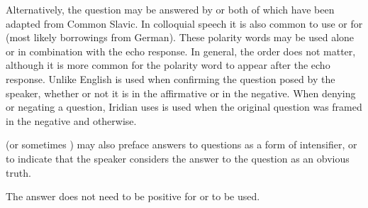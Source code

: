 \ex
{}
\xe

Alternatively, the question may be answered by  or 
both of which have been adapted from Common Slavic. In
colloquial speech it is also common to use  or  for 
(most likely borrowings from German). These polarity words may be
used alone or in combination with the echo response. In general, the order does
not matter, although it is more common for the polarity word to appear after the
echo response. Unlike English   is used when confirming the
question posed by the speaker, whether or not it is in the affirmative or in the
negative. When denying or negating a question, Iridian uses  is used
when the original question was framed in the negative and  otherwise.

\ex
{}\xe

\ex{}
\xe

 (or sometimes ) may also preface answers to questions as a
form of intensifier, or to indicate that the speaker considers the answer to the
question as an obvious truth.

\ex
{}\xe

The answer does not need to be positive for  or  to be used.

\ex{}
\xe



